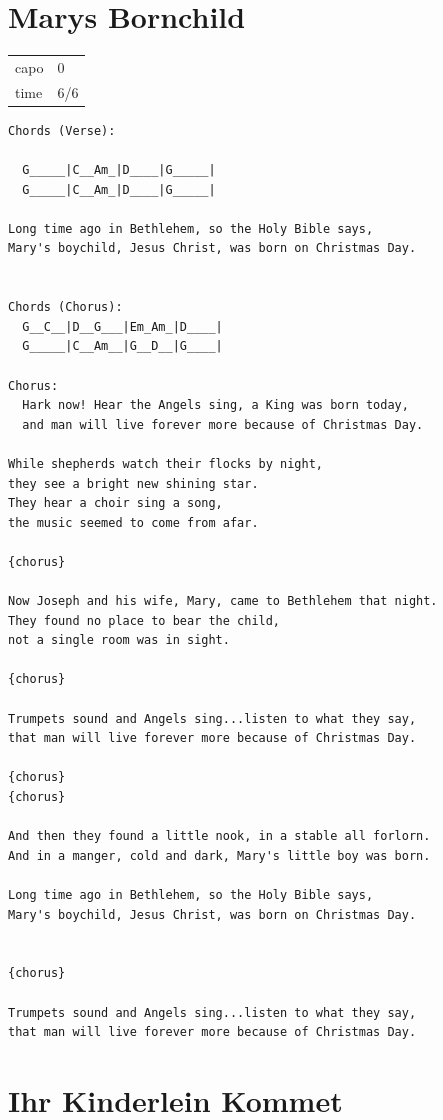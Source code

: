 \documentclass[
]{book}
\let\stdsection\section
\renewcommand\section{\clearpage\stdsection}
\begin{document}
\hypertarget{marys-bornchild}{%
\section{Marys Bornchild}\label{marys-bornchild}}

\begin{longtable}[]{@{}ll@{}}
\toprule
\endhead
capo & 0\tabularnewline
time & 6/6\tabularnewline
\bottomrule
\end{longtable}

\begin{verbatim}
Chords (Verse):
  
  G_____|C__Am_|D____|G_____|
  G_____|C__Am_|D____|G_____|

Long time ago in Bethlehem, so the Holy Bible says,  
Mary's boychild, Jesus Christ, was born on Christmas Day. 


Chords (Chorus):
  G__C__|D__G___|Em_Am_|D____|
  G_____|C__Am__|G__D__|G____|

Chorus:
  Hark now! Hear the Angels sing, a King was born today, 
  and man will live forever more because of Christmas Day. 

While shepherds watch their flocks by night, 
they see a bright new shining star. 
They hear a choir sing a song,  
the music seemed to come from afar.  
  
{chorus} 

Now Joseph and his wife, Mary, came to Bethlehem that night. 
They found no place to bear the child,  
not a single room was in sight.      
  
{chorus}

Trumpets sound and Angels sing...listen to what they say, 
that man will live forever more because of Christmas Day. 

{chorus}
{chorus}
  
And then they found a little nook, in a stable all forlorn. 
And in a manger, cold and dark, Mary's little boy was born.

Long time ago in Bethlehem, so the Holy Bible says,  
Mary's boychild, Jesus Christ, was born on Christmas Day. 

  
{chorus}

Trumpets sound and Angels sing...listen to what they say, 
that man will live forever more because of Christmas Day.
\end{verbatim}

\hypertarget{ihr-kinderlein-kommet}{%
\section{Ihr Kinderlein Kommet}\label{ihr-kinderlein-kommet}}
\end{document}
